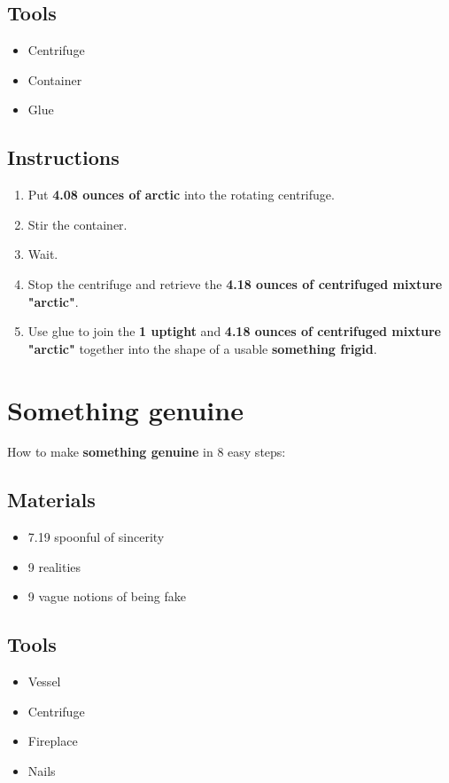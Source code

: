 \documentclass{article}
\begin{document}
\subsection{Tools}\begin{itemize}
\item 
Centrifuge
\item 
Container
\item 
Glue
\end{itemize}
\subsection{Instructions}\begin{enumerate}
\item 
Put \textbf{4.08 ounces of arctic} into the rotating centrifuge.
\item 
Stir the container.
\item 
Wait.
\item 
Stop the centrifuge and retrieve the \textbf{4.18 ounces of centrifuged mixture "arctic"}.
\item 
Use glue to join the \textbf{1 uptight} and \textbf{4.18 ounces of centrifuged mixture "arctic"} together into the shape of a usable \textbf{something frigid}.
\end{enumerate}
\newpage
\section{Something genuine}How to make \textbf{something genuine} in 8 easy steps:

\subsection{Materials}\begin{itemize}
\item 
7.19 spoonful of sincerity
\item 
9 realities
\item 
9 vague notions of being fake
\end{itemize}
\subsection{Tools}\begin{itemize}
\item 
Vessel
\item 
Centrifuge
\item 
Fireplace
\item 
Nails
\end{itemize}
\end{document}
